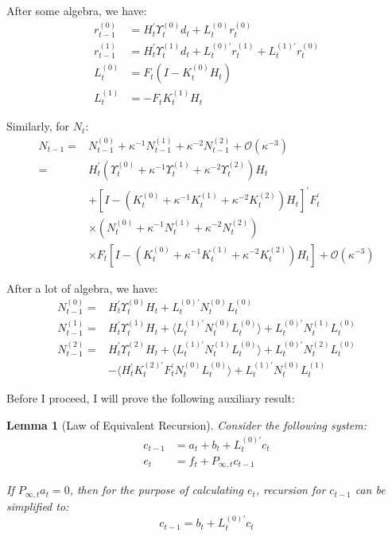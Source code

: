 \documentclass[12pt]{article}
\newtheorem{lemma}{Lemma}
\numberwithin{equation}{section}
\begin{document}
After some algebra, we have:
\begin{align*}
    r_{t-1}^{(0)} &= H_t^{'}\Upsilon_t^{(0)}d_t + L_t^{(0)}r_t^{(0)} \\
    r_{t-1}^{(1)} &= H_t^{'}\Upsilon_t^{(1)}d_t+L_t^{(0)'}r_t^{(1)} + L_t^{(1)'}r_t^{(0)} \\
    L_t^{(0)} &= F_t(I-K_t^{(0)}H_t) \\
    L_t^{(1)} &= -F_tK_t^{(1)}H_t 
\end{align*}

Similarly, for $N_t$:
\begin{align*}
    N_{t-1} =& N_{t-1}^{(0)} + \kappa^{-1}N_{t-1}^{(1)} + \kappa^{-2}N_{t-1}^{(2)} + \mathcal{O}(\kappa^{-3}) \\
    =& H_t^{'}(\Upsilon_t^{(0)}+\kappa^{-1}\Upsilon_t^{(1)}+\kappa^{-2}\Upsilon_t^{(2)})H_t \\
    &+[I-(K_t^{(0)}+\kappa^{-1}K_t^{(1)}+\kappa^{-2}K_t^{(2)})H_t]^{'}F_t^{'} \\
    &\times(N_t^{(0)}+\kappa^{-1}N_t^{(1)}+\kappa^{-2}N_t^{(2)}) \\
    &\times F_t[I-(K_t^{(0)}+\kappa^{-1}K_t^{(1)}+\kappa^{-2}K_t^{(2)})H_t] + \mathcal{O}(\kappa^{-3})
\end{align*}

After a lot of algebra, we have:
\begin{align*}
    N_{t-1}^{(0)} =& H_t^{'}\Upsilon_t^{(0)}H_t + L_t^{(0)'}N_t^{(0)}L_t^{(0)} \\
    N_{t-1}^{(1)} =& H_t^{'}\Upsilon_t^{(1)}H_t + \langle L_t^{(1)'}N_t^{(0)}L_t^{(0)}\rangle + L_t^{(0)'}N_t^{(1)}L_t^{(0)} \\
    N_{t-1}^{(2)} =& H_t^{'}\Upsilon_t^{(2)}H_t + \langle L_t^{(1)'}N_t^{(1)}L_t^{(0)}\rangle + L_t^{(0)'}N_t^{(2)}L_t^{(0)} \\
    &- \langle H_t^{'}K_t^{(2)'}F_t^{'}N_t^{(0)}L_t^{(0)}\rangle +  L_t^{(1)'}N_t^{(0)}L_t^{(1)}
\end{align*}

Before I proceed, I will prove the following auxiliary result:
\begin{lemma}[Law of Equivalent Recursion] \label{lem:2}
    Consider the following system:
    \begin{align*}
        c_{t-1} &= a_t + b_t + L_{t}^{(0)'}c_t \\
        e_t &= f_t + P_{\infty,t}c_{t-1}
    \end{align*}

    If $P_{\infty,t}a_t=0$, then for the purpose of calculating $e_t$, recursion for $c_{t-1}$ can be simplified to:
    \[
        c_{t-1} = b_t + L_t^{(0)'}c_t
    \]
\end{lemma}
\end{document}

